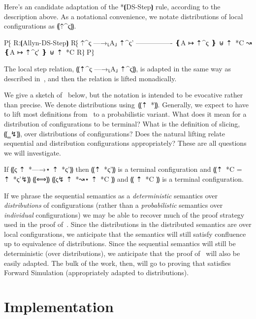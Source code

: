 Here's an candidate adaptation of the *⦗DS-Step⦘ rule, according to the description above. As
a notational convenience, we notate distributions of local configurations as ⸨⇡^ς⸩.

P⁅ Rː⦗Allyn-DS-Step⦘
   R⁅ ⇡^ς —→⸤A⸥ ⇡^{ς'}
      ----------------
      ❴A ↦ ⇡^ς ❵ ⊎ ⇡~*C ↝ ❴A ↦ ⇡^{ς′} ❵ ⊎ ⇡~*C
   R⁆
P⁆

The local step relation, ⸨⇡^ς —→⸤A⸥ ⇡^ς⸩, is adapted in the same way as described
in~, and then the relation is lifted monadically.

We give a sketch of~ below, but the notation is intended to be evocative rather
than precise. We denote distributions using~⸨⇡~*{}⸩. Generally, we expect to have to lift most definitions from~
to a probabilistic variant. What does it mean for a distribution of configurations to be terminal? What is the definition of slicing, ⸨‗↯⸩,
over distributions of configurations? Does the natural lifting relate sequential and distribution configurations appropriately? These
are all questions we will investigate.

\begin{theorem}\label{thm:lang-simulation}
    If ⸨ς ⇡~*{—→}⋆ ⇡~*{ς'}⸩ then ⸨⇡~*{ς'}⸩ is a terminal configuration and ⸨⇡~*C = ⇡~*{ς'}↯⸩ ⸨⟺⸩ ⸨ς↯ ⇡~*{↝}⋆ ⇡~*C ⸩ and ⸨ ⇡~*C ⸩ is a terminal configuration.
\end{theorem}

If we phrase the sequential semantics as a \emph{deterministic} semantics over \emph{distributions} of configurations
(rather than a \emph{probabilistic} semantics over \emph{individual} configurations) we may be able to recover much
of the proof strategy used in the proof of~. Since the distributions in the distributed
semantics are over local configurations, we anticipate that the semantics will still satisfy confluence up to equivalence
of distributions. Since the sequential semantics will still be deterministic (over distributions), we anticipate that the
proof of~ will also be easily adapted. The bulk of the work, then, will go to proving that
\lang satisfies Forward Simulation (appropriately adapted to distributions).

\section{Implementation}
\label{sec:proposal-impl}

